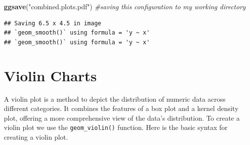\documentclass[
]{book}
\newenvironment{Shaded}{\begin{snugshade}}{\end{snugshade}}
\newcommand{\CommentTok}[1]{\textcolor[rgb]{0.56,0.35,0.01}{\textit{#1}}}
\newcommand{\FunctionTok}[1]{\textcolor[rgb]{0.13,0.29,0.53}{\textbf{#1}}}
\newcommand{\NormalTok}[1]{#1}
\newcommand{\StringTok}[1]{\textcolor[rgb]{0.31,0.60,0.02}{#1}}
\begin{document}
\begin{Shaded}
\begin{Highlighting}[]
\FunctionTok{ggsave}\NormalTok{(}\StringTok{"combined.plots.pdf"}\NormalTok{) }\CommentTok{\#saving this configuration to my working directory}
\end{Highlighting}
\end{Shaded}

\begin{verbatim}
## Saving 6.5 x 4.5 in image
## `geom_smooth()` using formula = 'y ~ x'
## `geom_smooth()` using formula = 'y ~ x'
\end{verbatim}

\hypertarget{violin-charts}{%
\section{Violin Charts}\label{violin-charts}}

A violin plot is a method to depict the distribution of numeric data across different categories. It combines the features of a box plot and a kernel density plot, offering a more comprehensive view of the data's distribution. To create a violin plot we use the \texttt{geom\_violin()} function. Here is the basic syntax for creating a violin plot.
\end{document}
